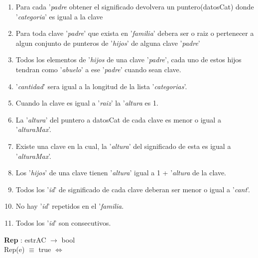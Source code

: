 \documentclass[10pt, a4paper]{article}
\begin{document}
	  \begin{enumerate}
	  
		\item Para cada '\textit{padre} obtener el significado devolvera un puntero(datosCat) donde '\textit{categoria}' es igual a la clave
	
		\item Para toda clave '\textit{padre}' que exista en '\textit{familia}' debera ser o raiz o pertenecer a algun conjunto de punteros de '\textit{hijos}' de alguna clave '\textit{padre}'
	  
		\item Todos los elementos de '\textit{hijos} de una clave '\textit{padre}', cada uno de estos hijos tendran como '\textit{abuelo}' a ese '\textit{padre}' cuando sean clave.
		
		\item '\textit{cantidad}' sera igual a la longitud de la lista '\textit{categorias}'.
		
		\item Cuando la clave es igual a '\textit{raiz}' la '\textit{altura} es 1.
		
		\item La '\textit{altura}' del puntero a datosCat de cada clave es menor o igual a '\textit{alturaMax}'.
		
		\item Existe una clave en la cual, la '\textit{altura}' del significado de esta es igual a '\textit{alturaMax}'.
		
		\item Los '\textit{hijos}' de una clave tienen '\textit{altura}' igual a 1 + '\textit{altura} de la clave.

		\item Todos los '\textit{id}' de significado de cada clave deberan ser menor o igual a '\textit{cant}'.
		
		\item No hay '\textit{id}' repetidos en el '\textit{familia}.
		
		\item Todos los '\textit{id}' son consecutivos.

		
	  \end{enumerate}
	 
	
	   \textbf{Rep} : estrAC $\longrightarrow$ bool\\
	        Rep(e) $\equiv$ true $\Longleftrightarrow$\\
	
\end{document}
